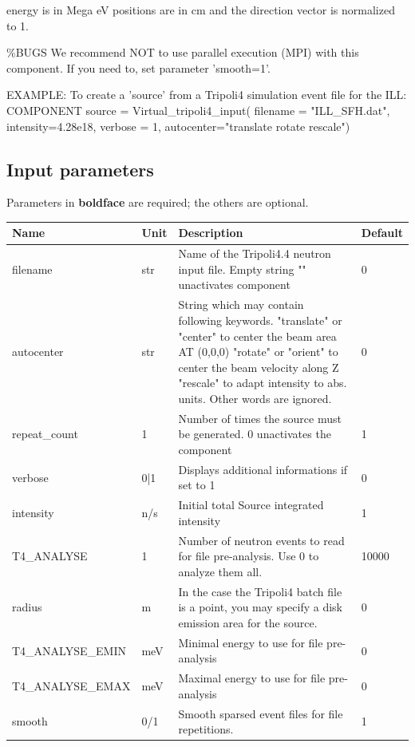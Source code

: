 energy is in Mega eV positions are in cm and the direction vector is normalized to 1.

\%BUGS We recommend NOT to use parallel execution (MPI) with this component. If you need to, set parameter 'smooth=1'.

EXAMPLE: To create a 'source' from a Tripoli4 simulation event file for the ILL: COMPONENT source = Virtual\_tripoli4\_input( filename = "ILL\_SFH.dat", intensity=4.28e18, verbose = 1, autocenter="translate rotate rescale")

\subsection*{Input parameters}
Parameters in \textbf{boldface} are required; the others are optional.

\begin{longtable}{p{}p{}p{}p{}}
\toprule
\textbf{Name} & \textbf{Unit} & \textbf{Description} & \textbf{Default} \\
\midrule
\endhead
filename & str & Name of the Tripoli4.4 neutron input file. Empty string "" unactivates component & 0 \\
autocenter & str & String which may contain following keywords. "translate" or "center"  to center the beam area AT (0,0,0) "rotate" or "orient" to center the beam velocity along Z "rescale" to adapt intensity to abs. units. Other words are ignored. & 0 \\
repeat\_count & 1 & Number of times the source must be generated. 0 unactivates the component & 1 \\
verbose & 0|1 & Displays additional informations if set to 1 & 0 \\
intensity & n/s & Initial total Source integrated intensity & 1 \\
T4\_ANALYSE & 1 & Number of neutron events to read for file pre-analysis. Use 0 to analyze them all. & 10000 \\
radius & m & In the case the Tripoli4 batch file is a point, you may specify a disk emission area for the source. & 0 \\
T4\_ANALYSE\_EMIN & meV & Minimal energy to use for file pre-analysis & 0 \\
T4\_ANALYSE\_EMAX & meV & Maximal energy to use for file pre-analysis & 0 \\
smooth & 0/1 & Smooth sparsed event files for file repetitions. & 1 \\
\bottomrule
\end{longtable}

